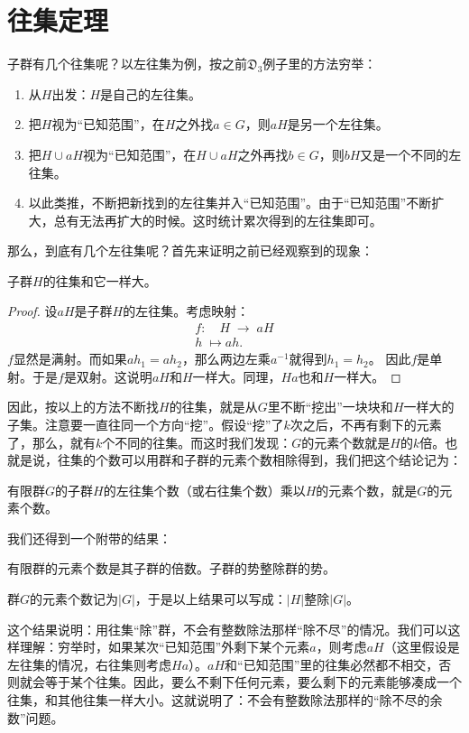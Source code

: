 \documentclass[12pt,UTF8,fontset=none]{ctexbook}
\begin{document}
\section{往集定理}

子群有几个往集呢？以左往集为例，按之前$\mathfrak{D}_3$例子里的方法穷举：
\begin{enumerate}
    \item 从$H$出发：$H$是自己的左往集。
    \item 把$H$视为“已知范围”，在$H$之外找$a\in G$，则$aH$是另一个左往集。
    \item 把$H\cup aH$视为“已知范围”，在$H\cup aH$之外再找$b\in G$，则$bH$又是一个不同的左往集。
    \item 以此类推，不断把新找到的左往集并入“已知范围”。由于“已知范围”不断扩大，总有无法再扩大的时候。这时统计累次得到的左往集即可。
\end{enumerate}

那么，到底有几个左往集呢？首先来证明之前已经观察到的现象：
\begin{tm}
    子群$H$的往集和它一样大。
\end{tm}
\begin{proof}
    设$aH$是子群$H$的左往集。考虑映射：
    \begin{align*}
        f:\quad H\;\longrightarrow \; aH\\
        h\;\longmapsto ah.
    \end{align*}
    $f$显然是满射。而如果$ah_1=ah_2$，那么两边左乘$a^{-1}$就得到$h_1=h_2$。
    因此$f$是单射。于是$f$是双射。这说明$aH$和$H$一样大。同理，$Ha$也和$H$一样大。
\end{proof}

因此，按以上的方法不断找$H$的往集，就是从$G$里不断“挖出”一块块和$H$一样大的子集。注意要一直往同一个方向“挖”。假设“挖”了$k$次之后，不再有剩下的元素了，那么，就有$k$个不同的往集。而这时我们发现：$G$的元素个数就是$H$的$k$倍。也就是说，往集的个数可以用群和子群的元素个数相除得到，我们把这个结论记为：
\begin{tm}[往集定理]
    有限群$G$的子群$H$的左往集个数（或右往集个数）乘以$H$的元素个数，就是$G$的元素个数。
\end{tm}
我们还得到一个附带的结果：
\begin{tm}[群势定理]
    有限群的元素个数是其子群的倍数。子群的势整除群的势。
\end{tm}
群$G$的元素个数记为$|G|$，于是以上结果可以写成：$|H|$整除$|G|$。

这个结果说明：用往集“除”群，不会有整数除法那样“除不尽”的情况。我们可以这样理解：穷举时，如果某次“已知范围”外剩下某个元素$a$，则考虑$aH$（这里假设是左往集的情况，右往集则考虑$Ha$）。$aH$和“已知范围”里的往集必然都不相交，否则就会等于某个往集。因此，要么不剩下任何元素，要么剩下的元素能够凑成一个往集，和其他往集一样大小。这就说明了：不会有整数除法那样的“除不尽的余数”问题。
\end{document}
